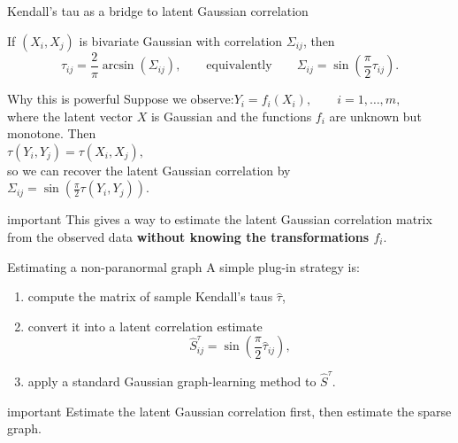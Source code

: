 \documentclass[dvipsnames,aspectratio=169,handout]{beamer}
\begin{document}
\begin{frame}{Kendall's tau as a bridge to latent Gaussian correlation}

If $(X_i,X_j)$ is bivariate Gaussian with correlation $\Sigma_{ij}$, then
\[
\tau_{ij}
=
\frac{2}{\pi}\arcsin(\Sigma_{ij}),
\qquad\mbox{equivalently}\qquad
\Sigma_{ij}
=
\sin\!\left(\frac{\pi}{2}\tau_{ij}\right).
\]

\begin{alertblock}{Why this is powerful}
Suppose we observe:\qquad$
Y_i=f_i(X_i), \qquad i=1,\ldots,m,
$\\[2mm]
where the latent vector $X$ is Gaussian and the functions $f_i$ are unknown but monotone.
Then\\[1mm]
\qquad\qquad\qquad\qquad\qquad\qquad$
\tau(Y_i,Y_j)=\tau(X_i,X_j),
$\\[1mm]
so we can recover the latent Gaussian correlation by\\[1mm]
\qquad\qquad\qquad\qquad\qquad\qquad$
\Sigma_{ij}
=
\sin\!\left(\frac{\pi}{2}\tau(Y_i,Y_j)\right).
$
\end{alertblock}

\begin{beamercolorbox}[wd=\textwidth,sep=7pt,center,rounded=true,shadow=true]{important}
This gives a way to estimate the latent Gaussian correlation matrix from the observed data
\textbf{without knowing the transformations $f_i$}.
\end{beamercolorbox}
\end{frame}


\begin{frame}{Estimating a non-paranormal graph}
A simple plug-in strategy is:

\begin{enumerate}
    \item compute the matrix of sample Kendall's taus $\hat\tau$,
    \item convert it into a latent correlation estimate
    \[
    \hat S^{\tau}_{ij}
    =
    \sin\!\left(\frac{\pi}{2}\hat\tau_{ij}\right),
    \]
    \item apply a standard Gaussian graph-learning method to $\hat S^\tau$.
\end{enumerate}

\begin{beamercolorbox}[wd=\textwidth,sep=7pt,center,rounded=true,shadow=true]{important}
Estimate the latent Gaussian correlation first, then estimate the sparse graph.
\end{beamercolorbox}
\end{frame}
\end{document}
